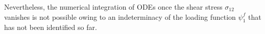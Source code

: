 Nevertheless, the numerical integration of ODEs once the shear stress $\sigma_{12}$ vanishes is not possible owing to an indeterminacy of the loading function $\psi_1^f$ that has not been identified so far.

%   

